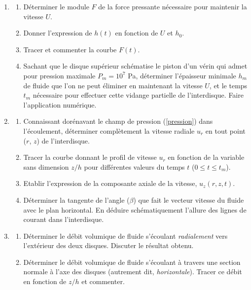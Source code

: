\begin{enumerate}
\begin{enumerate}
    $\partial p/\partial r$ et $\partial^2 p/\partial r^2$.
  \item 
    A l'aide des conditions aux limites sur $u_z$ en $z=0$ et $z = h(t)$, 
    en d\'eduire l'\'equation diff\'erentielle que doit v\'erifier $p$.
  \item 
    Montrer alors que la pression au sein du fluide a pour expression :
    \begin{equation}
      p(r, t) = P_a + \frac{3\mu U}{h(t)^3} (R^2 - r^2).
      \label{pression}
    \end{equation}
  \end{enumerate}
\item
  \begin{enumerate}
  \item 
    D\'eterminer le module $F$ de la force pressante n\'ecessaire pour maintenir
    la vitesse $U$.
  \item 
    Donner l'expression de $h(t)$ en fonction de $U$ et $h_0$.
  \item 
    Tracer et commenter la courbe $F(t)$.
  \item 
    Sachant que le disque sup\'erieur sch\'ematise le piston d'un v\'erin qui admet
    pour pression maximale $P_m = 10^7$ Pa, d\'eterminer l'\'epaisseur minimale
    $h_m$ de fluide que l'on ne peut \'eliminer en maintenant la vitesse $U$, et le temps 
    $t_m$ n\'ecessaire pour effectuer cette vidange partielle de l'interdisque. 
    Faire l'application num\'erique.
  \end{enumerate}
\item
  \begin{enumerate}
  \item 
    Connaissant dor\'enavant le champ de pression (\ref{pression}) dans l'\'ecoulement, 
    d\'eterminer compl\`etement la vitesse radiale $u_r$ en tout point
    ($r$, $z$) de l'interdisque.
  \item
    Tracer la courbe donnant le profil de vitesse $u_r$ en fonction de la variable
    sans dimension $z/h$ pour diff\'erentes valeurs du temps $t$
    ($0 \leq t \leq t_m$).
  \item
    Etablir l'expression de la composante axiale de la vitesse, $u_z(r, z, t)$.
  \item
    D\'eterminer la tangente de l'angle ($\beta$) que fait le vecteur vitesse
    du fluide avec le plan  horizontal.
    En d\'eduire sch\'ematiquement l'allure des lignes de courant dans
    l'interdisque.
  \end{enumerate}
\item
  \begin{enumerate}
  \item 
    D\'eterminer le d\'ebit volumique de fluide s'\'ecoulant \textit{radialement}
    vers l'ext\'erieur des deux disques. Discuter le r\'esultat obtenu.
  \item 
    D\'eterminer le d\'ebit volumique de fluide s'\'ecoulant \`a travers une
    section normale \`a l'axe des disques (autrement dit, \textit{horizontale}).
    Tracer ce d\'ebit en fonction de $z/h$ et commenter.
  \end{enumerate}
\end{enumerate}

